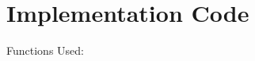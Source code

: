 \documentclass[a4paper,11pt]{article}
\begin{document}
	
	
	
	
	\section*{Implementation Code}  
	\captionsetup{labelformat=empty,labelsep=none}
	

	\large Functions Used:
	
	

	
	
	
	
	
\end{document}
